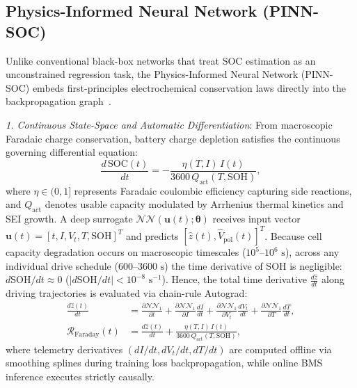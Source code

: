 \documentclass[balance,nocopyright,upint,varvw,hyphenate,barcolor=NavyBlue,nolists]{asmejour}
\begin{document}
\subsection{Physics-Informed Neural Network (PINN-SOC)}
Unlike conventional black-box networks that treat SOC estimation as an unconstrained regression task, the Physics-Informed Neural Network (PINN-SOC) embeds first-principles electrochemical conservation laws directly into the backpropagation graph~\cite{Raissi2019pinn,Brancato2026,Li2023nature}.

\emph{1. Continuous State-Space and Automatic Differentiation}: From macroscopic Faradaic charge conservation, battery charge depletion satisfies the continuous governing differential equation:
\begin{equation}\label{eqn:pinn_ode}
\frac{d\,\text{SOC}(t)}{dt} = -\frac{\eta(T, I)\, I(t)}{3600\,Q_{\text{act}}(T, \text{SOH})},
\end{equation}
where $\eta \in (0, 1]$ represents Faradaic coulombic efficiency capturing side reactions, and $Q_{\text{act}}$ denotes usable capacity modulated by Arrhenius thermal kinetics and SEI growth. A deep surrogate $\mathcal{NN}(\mathbf{u}(t); \boldsymbol{\theta})$ receives input vector $\mathbf{u}(t) = [t, I, V_t, T, \text{SOH}]^T$ and predicts $[\hat{z}(t), \hat{V}_{\text{pol}}(t)]^T$. Because cell capacity degradation occurs on macroscopic timescales ($10^5\text{--}10^6\text{ s}$), across any individual drive schedule ($600\text{--}3600\text{ s}$) the time derivative of SOH is negligible: $d\text{SOH}/dt \approx 0$ ($|d\text{SOH}/dt| < 10^{-8}\text{ s}^{-1}$). Hence, the total time derivative $\frac{d\hat{z}}{dt}$ along driving trajectories is evaluated via chain-rule Autograd:
\begin{align}
\frac{d\hat{z}(t)}{dt} &= \frac{\partial \mathcal{NN}_1}{\partial t} + \frac{\partial \mathcal{NN}_1}{\partial I} \frac{dI}{dt} + \frac{\partial \mathcal{NN}_1}{\partial V_t} \frac{dV_t}{dt} + \frac{\partial \mathcal{NN}_1}{\partial T} \frac{dT}{dt}, \label{eqn:pinn_chain}\\
\mathcal{R}_{\text{Faraday}}(t) &= \frac{d\hat{z}(t)}{dt} + \frac{\eta(T, I)\, I(t)}{3600\,Q_{\text{act}}(T, \text{SOH})}, \label{eqn:res_faraday}
\end{align}
where telemetry derivatives $(dI/dt, dV_t/dt, dT/dt)$ are computed offline via smoothing splines during training loss backpropagation, while online BMS inference executes strictly causally.
\end{document}
